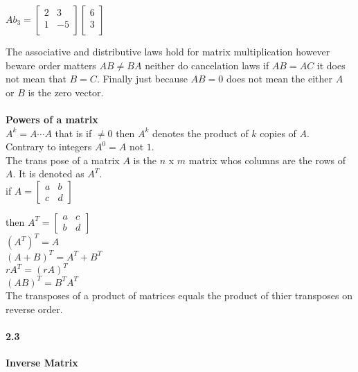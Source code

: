\documentclass[14pt]{extreport}
\begin{document}
$Ab_3 = \begin{bmatrix}
	2 & 3\\
	1 & -5\\
	\end{bmatrix}
	\begin{bmatrix}
	6\\
	3\\
	\end{bmatrix}
$

The associative and distributive laws hold for matrix multiplication however beware order matters $AB \ne BA$ neither do cancelation laws if $AB = AC$ it does not mean that $B = C$. Finally just because $AB=0$ does not mean the either $A$ or $B$ is the zero vector.\\\\

\textbf{Powers of a matrix}\\

$A^k = A \cdots A$ that is if $ \ne 0$ then $A^k$ denotes the product of $k$ copies of $A$.\\

Contrary to integers $A^0 = A$ not $1$.\\

The trans pose of a matrix $A$ is the $n$ x $m$ matrix whos columns are the rows of $A$. It is denoted as $A^T$.\\

if $A = \begin{bmatrix} a & b\\ c & d \end{bmatrix}$ 

then $A^T = \begin{bmatrix} a & c\\ b & d \end{bmatrix}$\\

$(A^T)^T = A$\\
$(A + B)^T = A^T + B^T$\\
$rA^T = (rA)^T$\\
$(AB)^T = B^TA^T$\\

The transposes of a product of matrices equals the product of thier transposes on reverse order.\\


\paragraph{2.3}\textbf{Inverse Matrix}\\
\end{document}
